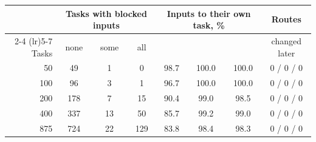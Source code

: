 \begin{tabular}{rccccccc}
    \toprule
    & \multicolumn{3}{c}{Tasks with blocked inputs} & \multicolumn{3}{c}{Inputs to their own task, \%} & Routes \\
    \cmidrule(lr){2-4} \cmidrule(lr){5-7}
    Tasks & none & some & all & \cert{} & \exactfirst{} & \nearest{} & changed later \\
    \midrule
    50 & 49 & 1 & 0 & 98.7 & 100.0 & 100.0 & 0 / 0 / 0 \\
    100 & 96 & 3 & 1 & 96.7 & 100.0 & 100.0 & 0 / 0 / 0 \\
    200 & 178 & 7 & 15 & 90.4 & 99.0 & 98.5 & 0 / 0 / 0 \\
    400 & 337 & 13 & 50 & 85.7 & 99.2 & 99.0 & 0 / 0 / 0 \\
    875 & 724 & 22 & 129 & 83.8 & 98.4 & 98.3 & 0 / 0 / 0 \\
    \bottomrule
\end{tabular}
